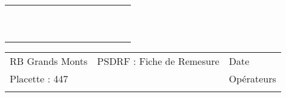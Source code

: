\documentclass[a4paper, landscape]{article}\usepackage[]{graphicx}\usepackage[]{color}
\begin{document}
{\begin{tabular}{|p{1cm}|p{2cm}|p{1.6cm}|p{1.6cm}|p{1.6cm}|p{1.6cm}|p{1.5cm}|p{1.5cm}|p{1.5cm}|p{1.5cm}|p{1.5cm}|p{7.5cm}|p{5cm}|}
   \rowcolor[gray]{0.95} \hline
 &  &  &  &  &  &  &  &  &  &  &  &  \\ 
   \hline
 &  &  &  &  &  &  &  &  &  &  &  &  \\ 
   \rowcolor[gray]{0.95} \hline
 &  &  &  &  &  &  &  &  &  &  &  &  \\ 
   \hline
 &  &  &  &  &  &  &  &  &  &  &  &  \\ 
   \rowcolor[gray]{0.95} \hline
 &  &  &  &  &  &  &  &  &  &  &  &  \\ 
   \hline
 &  &  &  &  &  &  &  &  &  &  &  &  \\ 
   \rowcolor[gray]{0.95} \hline
 &  &  &  &  &  &  &  &  &  &  &  &  \\ 
   \hline
 &  &  &  &  &  &  &  &  &  &  &  &  \\ 
   \rowcolor[gray]{0.95} \hline
 &  &  &  &  &  &  &  &  &  &  &  &  \\ 
   \hline
 &  &  &  &  &  &  &  &  &  &  &  &  \\ 
   \rowcolor[gray]{0.95} \hline
 &  &  &  &  &  &  &  &  &  &  &  &  \\ 
   \hline
\end{tabular}
}

\begin{tabular}{p{10cm}p{10cm}p{8cm}}
  RB Grands Monts & PSDRF : Fiche de Remesure & Date \\ 
  Placette : 447 &  & Opérateurs \\ 
   &  &  \\ 
  \end{tabular}
\end{document}

